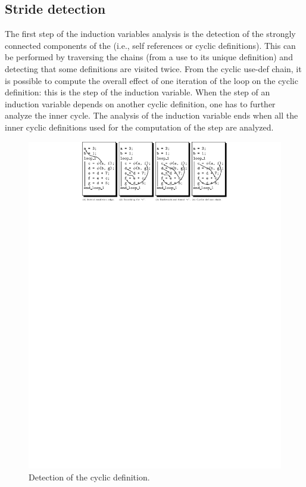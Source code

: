 \subsection{Stride detection}

The first step of the induction variables analysis is the detection of
the strongly connected components of the \SSA{} (i.e., self references
or cyclic definitions).  This can be performed by traversing the
\SSA{} chains (from a use to its unique definition) and detecting that
some definitions are visited twice.  From the cyclic use-def chain, it
is possible to compute the overall effect of one iteration of the loop
on the cyclic definition: this is the step of the induction variable.
When the step of an induction variable depends on another cyclic
definition, one has to further analyze the inner cycle.  The analysis
of the induction variable ends when all the inner cyclic definitions
used for the computation of the step are analyzed.

\begin{figure}[h]
  \begin{center}
    \includegraphics[width=1.2\textwidth]{fig/iv_step}
  \end{center}
  \vspace{-50em}
  \caption{Detection of the cyclic definition.}
  \label{spop:fig:ivstep}
\end{figure}

